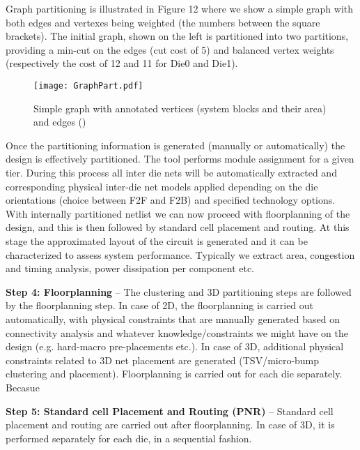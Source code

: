 Graph partitioning is illustrated in Figure 12 where we show a simple graph with both edges and vertexes being weighted (the numbers between the square brackets). The initial graph, shown on the left is partitioned into two partitions, providing a min-cut on the edges (cut cost of 5) and balanced vertex weights (respectively the cost of 12 and 11 for Die0 and Die1).

\begin{figure}[!b]%
\centering
\texttt{[image: GraphPart.pdf]}
\caption{Simple graph with annotated vertices (system blocks and their area) and edges ()\label{fig:GraphPart}}
\end{figure}

Once the partitioning information is generated (manually or automatically) the design is effectively partitioned. The tool performs module assignment for a given tier. During this process all inter die nets will be automatically extracted and corresponding physical inter-die net models applied depending on the die orientations (choice between F2F and F2B) and specified technology options. With internally partitioned netlist we can now proceed with floorplanning of the design, and this is then followed by standard cell placement and routing. At this stage the approximated layout of the circuit is generated and it can be characterized to assess system performance. Typically we extract area, congestion and timing analysis, power dissipation per component etc.

\textbf{Step 4: Floorplanning} – The clustering and 3D partitioning steps are followed by the floorplanning step. In case of 2D, the floorplanning is carried out automatically, with physical constraints that are manually generated based on connectivity analysis and whatever knowledge/constraints we might have on the design (e.g. hard-macro pre-placements etc.). In case of 3D, additional physical constraints related to 3D net placement are generated (TSV/micro-bump clustering and placement). Floorplanning is carried out for each die separately. Becasue 

\textbf{Step 5: Standard cell Placement and Routing (PNR)} – Standard cell placement and routing are carried out after floorplanning. In case of 3D, it is performed separately for each die, in a sequential fashion.
